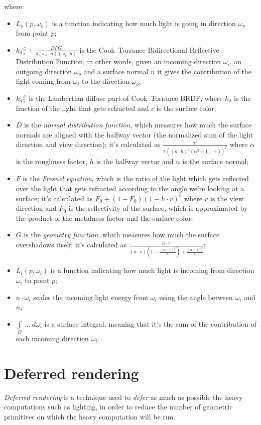 \documentclass[11pt,a4paper]{report}
\begin{document}
where:
\begin{itemize}
	\item $L_o(p, \omega_o)$ is a function indicating how much light is going in direction $\omega_o$ from point $p$;
	\item $k_d \frac{c}{\pi} + \frac{DFG}{4(\omega_o \cdot n)(\omega_i \cdot n)}$ is the Cook--Torrance Bidirectional Reflective Distribution Function, in other words, given an incoming direction $\omega_i$, an outgoing direction $\omega_o$ and a surface normal $n$ it gives the contribution of the light coming from $\omega_i$ to the direction $\omega_o$;
	\item $k_d \frac{c}{\pi}$ is the Lambertian diffuse part of Cook--Torrance BRDF, where $k_d$ is the fraction of the light that gets refracted and $c$ is the surface color;
	\item $D$ is the \textit{normal distribution function}, which measures how much the surface normals are aligned with the halfway vector (the normalized sum of the light direction and view direction); it's calculated as $\frac{\alpha^2}{\pi((n \cdot h)^2(\alpha^2 - 1) + 1)^2}$ where $\alpha$ is the roughness factor, $h$ is the halfway vector and $n$ is the surface normal;
	\item $F$ is the \textit{Fresnel equation}, which is the ratio of the light which gets reflected over the light that gets refracted according to the angle we're looking at a surface; it's calculated as $F_0 + (1 - F_0)(1 - h \cdot v)^5$ where $v$ is the view direction and $F_0$ is the reflectivity of the surface, which is approximated by the product of the metalness factor and the surface color;
	\item $G$ is the \textit{geometry function}, which measures how much the surface overshadows itself; it's calculated as $\frac{n \cdot v}{(n \cdot v)(1 - \frac{(\alpha + 1)^2}{8}) + \frac{(\alpha + 1)^2}{8}}$;
	\item $L_i(p, \omega_i)$ is a function indicating how much light is incoming from direction $\omega_i$ to point $p$;
	\item $n \cdot \omega_i$ scales the incoming light energy from $\omega_i$ using the angle between $\omega_i$ and $n$;
	\item $\int \limits_{\Omega} ~\dots~ d \omega_i$ is a surface integral, meaning that it's the sum of the contribution of each incoming direction $\omega_i$.
\end{itemize}

\section{Deferred rendering}
\textit{Deferred rendering} is a technique used to \textit{defer} as much as possible the heavy computations such as lighting, in order to reduce the number of geometric primitives on which the heavy computation will be run.
\end{document}

